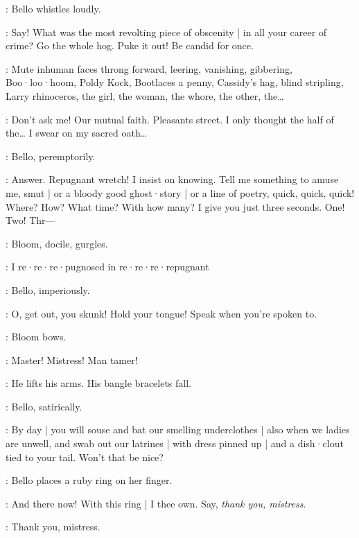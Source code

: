 :
Bello whistles loudly.

\Bello:
Say!
What was the most revolting piece of obscenity |
in all your career of crime?
Go the whole hog.
Puke it out!
Be candid for once.

:
Mute inhuman faces throng forward,
leering,
vanishing,
gibbering,
Boo·loo·hoom,
Poldy Kock,
Bootlaces a penny,
Cassidy's hag,
blind stripling,
Larry rhinoceros,
the girl,
the woman,
the whore,
the other,
the…

\Bloom:
Don't ask me!
Our mutual faith.
Pleasants street.
I only thought the half of the…
I swear on my sacred oath…%

:
Bello,
peremptorily.

\Bello:
Answer.
Repugnant wretch!
I insist on knowing.
Tell me something to amuse me,
smut |
or a bloody good ghost·story |
or a line of poetry,
quick,
quick,
quick!
Where?
How?
What time?
With how many?
I give you just three seconds.
One!
Two!
Thr---

:
Bloom,
docile,
gurgles.

\Bloom:
I re·re·re·pugnosed in re·re·re·repugnant

:
Bello,
imperiously.

\Bello:
O,
get out,
you skunk!
Hold your tongue!
Speak when you're spoken to.%

:
Bloom bows.

\Bloom:
Master!
Mistress!
Man tamer!

:
He lifts his arms.
His bangle bracelets fall.

:
Bello,
satirically.

\Bello:
By day |
you will souse and bat our smelling underclothes |
also when we ladies are unwell,
and swab out our latrines |
with dress pinned up |
and a dish·clout tied to your tail.
Won't that be nice?

:
Bello places a ruby ring on her finger.

\Bello:
And there now!
With this ring |
I thee own.
Say,
\emph{thank you,
mistress}.

\Bloom:
Thank you,
mistress.

